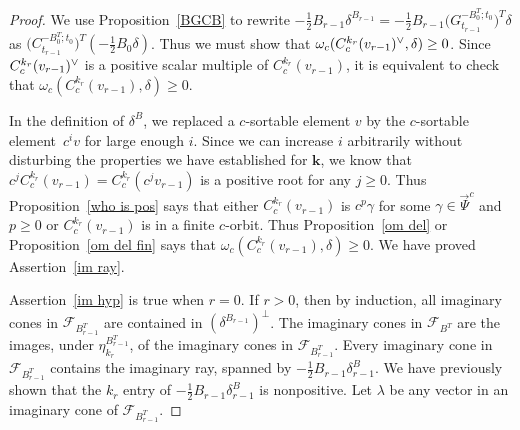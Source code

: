 \documentclass{amsart}
\theoremstyle{definition}
\theoremstyle{remark}
\numberwithin{equation}{section}
\newcommand{\F}{{\mathcal F}}
\newcommand{\ck}{\spcheck}
\newcommand{\0}{{\mathbf{0}}}
\newcommand{\kk}{{\boldsymbol{k}}}
\newcommand{\TravInfChar}{\Psi}
\newcommand{\TravProj}[1]{\overrightarrow{\TravInfChar}^{#1}}
\begin{document}
\begin{proof}
We use Proposition~\ref{BGCB} to rewrite $-\frac12B_{r-1}\delta^{B_{r-1}}=-\frac12B_{r-1}\bigl(G_{t_{r-1}}^{-B_0^T;t_0}\bigr)^T\delta$ as $\bigl(C_{t_{r-1}}^{-B_0^T;t_0}\bigr)^T(-\frac12B_0\delta)$.
Thus we must show that $\omega_c(C^{k_r}_c(v_{r-1})\ck,\delta)\ge0$. 
Since $C^{k_r}_c(v_{r-1})\ck$ is a positive scalar multiple of $C^{k_r}_c(v_{r-1})$, it is equivalent to check that $\omega_c(C^{k_r}_c(v_{r-1}),\delta)\ge0$. 

In the definition of $\delta^B$, we replaced a $c$-sortable element $v$ by the $c$-sortable element~$c^iv$ for large enough $i$.
Since we can increase $i$ arbitrarily without disturbing the properties we have established for $\kk$, we know that $c^jC^{k_r}_c(v_{r-1})=C^{k_r}_c(c^jv_{r-1})$ is a positive root for any $j\ge0$.
Thus Proposition~\ref{who is pos} says that either $C^{k_r}_c(v_{r-1})$ is $c^p\gamma$ for some $\gamma\in\TravProj{c}$ and $p\ge0$ or $C^{k_r}_c(v_{r-1})$ is in a finite $c$-orbit.
Thus Proposition~\ref{om del} or Proposition~\ref{om del fin} says that $\omega_c(C^{k_r}_c(v_{r-1}),\delta)\ge0$. 
We have proved Assertion~\ref{im ray}.

Assertion~\ref{im hyp} is true when $r=0$.
If $r>0$, then by induction, all imaginary cones in $\F_{B_{r-1}^T}$ are contained in $(\delta^{B_{r-1}})^\perp$.
The imaginary cones in $\F_{B^T}$ are the images, under $\eta^{B^T_{r-1}}_{k_r}$, of the imaginary cones in $\F_{B_{r-1}^T}$.
Every imaginary cone in $\F_{B_{r-1}^T}$ contains the imaginary ray, spanned by $-\frac12B_{r-1}\delta^B_{r-1}$.
We have previously shown that the $k_r$ entry of $-\frac12B_{r-1}\delta^B_{r-1}$ is nonpositive.
Let $\lambda$ be any vector in an imaginary cone of $\F_{B_{r-1}^T}$.


\end{proof}
\end{document}
